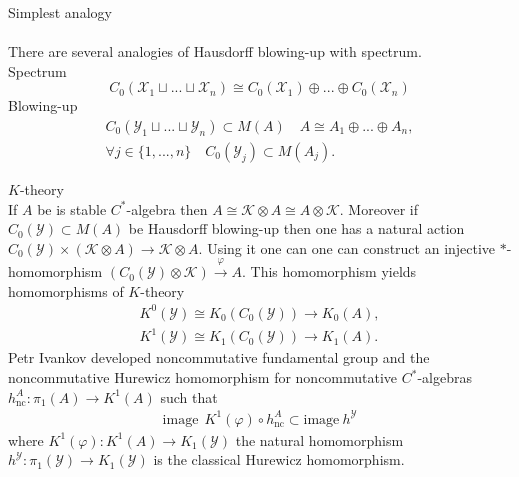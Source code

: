 \documentclass{beamer}
\theoremstyle{plain}
\newcommand{\K}{\mathcal{K}}
\newcommand{\sX}{\mathcal{X}}       %
\newcommand{\sY}{\mathcal{Y}}       %
\newcommand{\bean}{\begin{eqnarray*}}
\newcommand{\eean}{\end{eqnarray*}}
\begin{document}
\begin{frame}
	\huge{Simplest analogy} \normalsize\\
	$~$\\
There are several  analogies of Hausdorff blowing-up  with spectrum.\\
Spectrum
$$
C_0\left(\sX_1\sqcup ...\sqcup \sX_n \right) \cong C_0\left(\sX_1 \right) \oplus ...\oplus C_0\left(\sX_n \right) 
$$
Blowing-up
\bean
C_0\left( \sY_1\sqcup ...\sqcup \sY_n\right)\subset M\left( A\right)\quad   
A \cong A_1\oplus ...\oplus A_n,\\
\forall j \in \{1,...,n\}\quad C_0\left(\sY_j \right) \subset M\left(A_j \right). 
\eean

\end{frame}
\begin{frame}
	\huge{$K$-theory} \normalsize\\
If $A$ be is  stable $C^*$-algebra then $A \cong \K\otimes A\cong A\otimes \K$. Moreover if  $C_0\left( \sY\right) \subset M\left( A\right)$ be Hausdorff blowing-up then one has a  natural action 
$
C_0\left(\sY \right)\times  \left(\K\otimes A \right)\to \K\otimes A 
$.
Using it one can one can construct an  injective $*$-homomorphism
$
\left(C_0\left(\sY \right) \otimes \K \right) \xrightarrow{\varphi} A
$.
This homomorphism yields homomorphisms of $K$-theory
\bean
K^0\left(\sY \right)\cong K_0\left(C_0\left( \sY\right)  \right) \to K_0\left( A\right),\\
K^1\left(\sY \right)\cong K_1\left(C_0\left( \sY\right)  \right) \to K_1\left( A\right).
\eean
\alert{Petr Ivankov} developed  \alert{noncommutative fundamental group} %
and the  \alert{noncommutative Hurewicz homomorphism} for noncommutative $C^*$-algebras
$h^A_{\text{nc}}: \pi_1\left(A \right) \to K^1\left( A\right)$
such that
\bean
 \text{image}~~ K^1\left(\varphi \right)\circ h^A_{\text{nc}}\subset \text{image}  ~h^\sY
\eean
where  $K^1\left(\varphi \right): K^1\left(A \right) \to K_1\left(\sY \right)$ the natural homomorphism  $h^\sY: \pi_1\left(\sY \right)\to K_1\left( \sY\right)$ is the classical  Hurewicz homomorphism.%
\end{frame}
\end{document}
